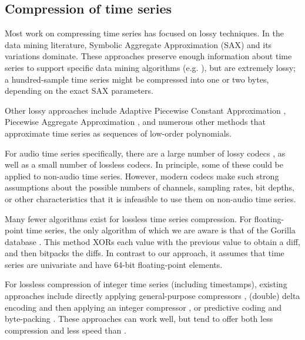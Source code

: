 
\subsection{Compression of time series}

Most work on compressing time series has focused on lossy techniques. In the data mining literature, Symbolic Aggregate Approximation (SAX) \cite{SAX} and its variations \cite{isax, isax2} dominate. These approaches preserve enough information about time series to support specific data mining algorithms (e.g. \cite{fastShapelet, hotSax}), but are extremely lossy; a hundred-sample time series might be compressed into one or two bytes, depending on the exact SAX parameters.

Other lossy approaches include Adaptive Piecewise Constant Approximation \cite{apca}, Piecewise Aggregate Approximation \cite{paa}, and numerous other methods \cite{swab, lemireSegmentation, tsCompressSmartGrid} that approximate time series as sequences of low-order polynomials.

For audio time series specifically, there are a large number of lossy codecs \cite{vorbis, shorten, aac, opus}, as well as a small number of lossless \cite{flac, alac} codecs. In principle, some of these could be applied to non-audio time series. However, modern codecs make such strong assumptions about the possible numbers of channels, sampling rates, bit depths, or other characteristics that it is infeasible to use them on non-audio time series.

Many fewer algorithms exist for lossless time series compression. For floating-point time series, the only algorithm of which we are aware is that of the Gorilla database \cite{gorilla}. This method XORs each value with the previous value to obtain a diff, and then bitpacks the diffs. In contrast to our approach, it assumes that time series are univariate and have 64-bit floating-point elements. %

For lossless compression of integer time series (including timestamps), existing approaches include directly applying general-purpose compressors \cite{respawnDB, openTSDB, chronicleDB, kairosDB, druid}, (double) delta encoding and then applying an integer compressor \cite{influxDB, gorilla}, or predictive coding and byte-packing \cite{akumuli}. These approaches can work well, but tend to offer both less compression and less speed than \mine.

